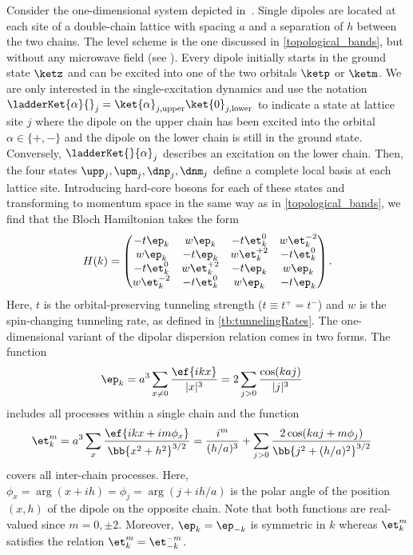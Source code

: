 Consider the one-dimensional system depicted in~.
Single dipoles are located at each site of a double-chain lattice with spacing $a$ and a separation of $h$ between the two chains.
The level scheme is the one discussed in \cref{topological_bands}, but without any microwave field (see ). Every dipole initially starts in the ground state $\ketz$ and can be excited into one of the two orbitals $\ketp$ or $\ketm$.
We are only interested in the single-excitation dynamics and use the notation $\ladderKet{\alpha}{}_j = \ket{\alpha}_{j,\text{upper}} \ket{0}_{j,\text{lower}}$ to indicate a state at lattice site $j$ where the dipole on the upper chain has been excited into the orbital $\alpha \in \{+, -\}$ and the dipole on the lower chain is still in the ground state.
Conversely, $\ladderKet{}{\alpha}_j$ describes an excitation on the lower chain.
Then, the four states $\upp_j, \upm_j, \dnp_j, \dnm_j$ define a complete local basis at each lattice site.
Introducing hard-core bosons for each of these states and transforming to momentum space in the same way as in \cref{topological_bands}, we find that the Bloch Hamiltonian takes the form
\begin{align}
    H(k) =
    \begin{pmatrix}
        -t \ep_k  & w \ep_k & -t \et^0_k & w \et^{-2}_k \\
        w \ep_k & -t \ep_k  & w \et^{+2}_k & -t \et^0_k \\
        -t \et^0_{k} & w \et^{+2}_{k}  & -t \ep_k  & w \ep_k \\
        w \et^{-2}_{k} & -t \et^0_{k} & w \ep_k & -t \ep_k
    \end{pmatrix}.
\end{align}
Here, $t$ is the orbital-preserving tunneling strength ($t \equiv t^+ = t^-$) and $w$ is the spin-changing tunneling rate, as defined in \cref{tb:tunnelingRates}.
The one-dimensional variant of the dipolar dispersion relation comes in two forms. The function
\begin{align}
    \ep_k &= a^3 \sum_{x\ne 0} \frac{\ef{i k x}}{|x|^3} = 2 \sum_{j>0} \frac{\cos(k a j)}{|j|^3}
\end{align}
includes all processes within a single chain and the function
\begin{align}
    \et^m_k &= a^3 \sum_{x} \frac{\ef{i k x + i m \phi_x}}{\bb{x^2 + h^2}^{3/2}}
    = \frac{i^m}{(h/a)^3} + \sum_{j>0} \frac{2\cos(ka j+m\phi_j)}{\bb{j^2+(h/a)^2}^{3/2}}
\end{align}
covers all inter-chain processes. Here, $\phi_x = \arg(x+ i h)=\phi_j=\arg(j+ i h/a)$ is the polar angle of the position $(x, h)$ of the dipole on the opposite chain.
Note that both functions are real-valued since $m = 0, \pm 2$. Moreover, $\ep_k=\ep_{-k}$ is symmetric in $k$ whereas $\et^m_k$ satisfies the relation $\et^m_k=\et^{-m}_{-k}$.

